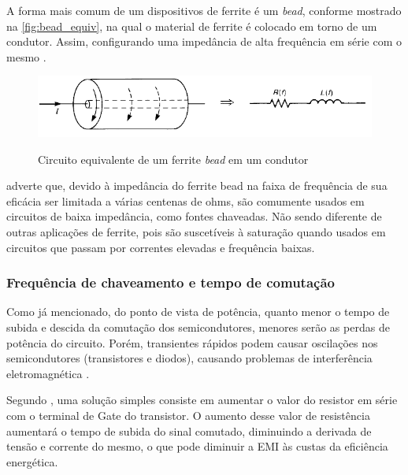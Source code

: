             A forma mais comum de um dispositivos de ferrite é um \textit{bead}, conforme mostrado na \autoref{fig:bead_equiv}, na qual o material de ferrite é colocado em torno de um condutor. Assim, configurando uma impedância de alta frequência em série com o mesmo \cite{ref:EMC_livro_Paul}.
            
            \begin{figure}[H]
            	\centering
            	\caption{Circuito equivalente de um ferrite \textit{bead} em um condutor}
            	\includegraphics[scale=1]{pdf/outros/bead_equivalente.pdf}
            	\label{fig:bead_equiv}
            \end{figure}
            
             adverte que, devido à impedância do ferrite bead na faixa de frequência de sua eficácia ser limitada a várias centenas de ohms, são comumente usados em circuitos de baixa impedância, como fontes chaveadas. Não sendo diferente de outras aplicações de ferrite, pois são suscetíveis à saturação quando usados em circuitos que passam por correntes elevadas e frequência baixas.
            
            \subsubsection{Frequência de chaveamento e tempo de comutação} \label{cap:fund_emc_conv_mitig_trans}
            
            Como já mencionado, do ponto de vista de potência, quanto menor o tempo de subida e descida da comutação dos semicondutores, menores serão as perdas de potência do circuito. Porém, transientes rápidos podem causar oscilações nos semicondutores (transistores e diodos), causando problemas de interferência eletromagnética \cite{ref:EMC_artigo_Texas}. 
            
            Segundo , uma solução simples consiste em aumentar o valor do resistor em série com o terminal de Gate do transistor. O aumento desse valor de resistência aumentará o tempo de subida do sinal comutado, diminuindo a derivada de tensão e corrente do mesmo, o que pode diminuir a EMI às custas da eficiência energética.
            
